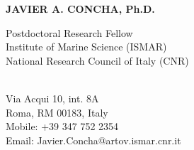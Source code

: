 \documentclass[11pt]{res}
\begin{document}
 
{\centering \Large \bf JAVIER A. CONCHA, Ph.D.\par} %
\vspace{0.3in}                                         
\begin{multicols}{2}
{\raggedright Postdoctoral Research Fellow\\ Institute of Marine Science (ISMAR)\\ National Research Council of Italy (CNR)\\ ~~~~~~~~~~~~~~~~~~~~~~~~~~~~~~~~~~~\\}
{\raggedleft Via Acqui 10, int. 8A\\Roma, RM 00183, Italy\\Mobile: +39 347 752 2354\\Email: Javier.Concha@artov.ismar.cnr.it\\}
\end{multicols}
\vspace{-0.4in} 
\hrulefill
\end{document}
